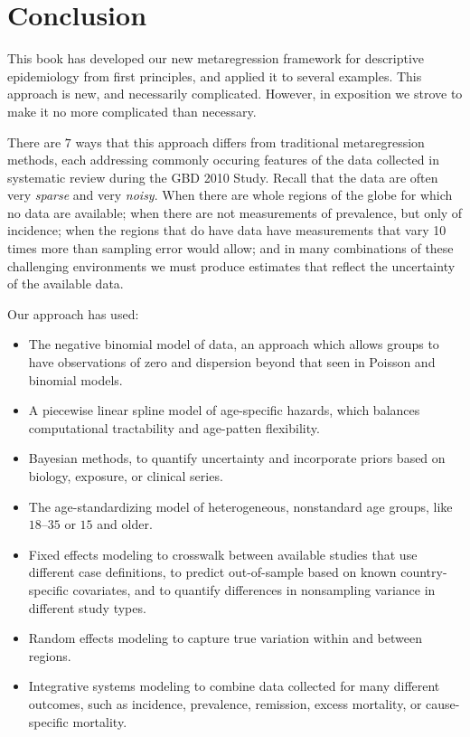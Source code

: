 \chapter{Conclusion}

This book has developed our new metaregression framework for
descriptive epidemiology from first principles, and applied it to
several examples.  This approach is new, and necessarily complicated.
However, in exposition we strove to make it no more complicated than
necessary.

There are $7$ ways that this approach differs from traditional
metaregression methods, each addressing commonly occuring features of
the data collected in systematic review during the GBD 2010 Study.
Recall that the data are often very \emph{sparse} and very
\emph{noisy}.  When there are whole regions of the globe for which no
data are available; when there are not measurements of prevalence, but
only of incidence; when the regions that do have data have
measurements that vary 10 times more than sampling error would allow;
and in many combinations of these challenging environments we must
produce estimates that reflect the uncertainty of the available data.

Our approach has used:
\begin{itemize}
\item The negative binomial model of data, an approach which allows groups to have
observations of zero and dispersion beyond that seen in Poisson and binomial models.

\item A piecewise linear spline model of age-specific hazards, which balances computational
tractability and age-patten flexibility.

\item Bayesian methods, to quantify uncertainty and incorporate priors
  based on biology, exposure, or clinical series.

\item The age-standardizing model of heterogeneous, nonstandard age groups, like $18$--$35$
or $15$ and older.

\item Fixed effects modeling to crosswalk between available studies that use
different case definitions, to predict out-of-sample based on known
country-specific covariates, and to quantify differences in
nonsampling variance in different study types.

\item Random effects modeling to capture true variation within and between regions.

\item Integrative systems modeling to combine data collected for many different outcomes,
such as incidence, prevalence, remission, excess mortality, or
cause-specific mortality.
\end{itemize}

